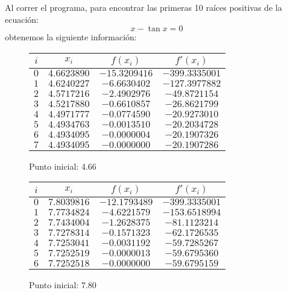 
Al correr el programa, para encontrar las primeras 10 raíces positivas de la ecuación:
\begin{equation*}
	x - \tan{x} = 0
\end{equation*}
obtenemos la siguiente información: 

\begin{figure}[H]
	\centering
	\caption{Punto inicial: 4.66}
	\begin{tabular}{|c|c|c|c|} \hline
		$i$ & $x_{i}$ & $f(x_{i})$ & $f'(x_{i})$ \\ \hline
		$0$ & $4.6623890$ & $-15.3209416$ & $-399.3335001$ \\ \hline
		$1$ & $4.6240227$ & $-6.6630402$ & $-127.3977882$ \\ \hline
		$2$ & $4.5717216$ & $-2.4902976$ & $-49.8721154$ \\ \hline
		$3$ & $4.5217880$ & $-0.6610857$ & $-26.8621799$ \\ \hline
		$4$ & $4.4971777$ & $-0.0774590$ & $-20.9273010$ \\ \hline
		$5$ & $4.4934763$ & $-0.0013510$ & $-20.2034728$ \\ \hline
		$6$ & $4.4934095$ & $-0.0000004$ & $-20.1907326$ \\ \hline
		$7$ & $4.4934095$ & $-0.0000000$ & $-20.1907286$ \\ \hline
	\end{tabular}
\end{figure}
\begin{figure}[H]
	\centering
	\caption{Punto inicial: 7.80}
	\begin{tabular}{|c|c|c|c|} \hline
		$i$ & $x_{i}$ & $f(x_{i})$ & $f'(x_{i})$ \\ \hline
		$0$ & $7.8039816$ & $-12.1793489$ & $-399.3335001$ \\ \hline
		$1$ & $7.7734824$ & $-4.6221579$ & $-153.6518994$ \\ \hline
		$2$ & $7.7434004$ & $-1.2628375$ & $-81.1123214$ \\ \hline
		$3$ & $7.7278314$ & $-0.1571323$ & $-62.1726535$ \\ \hline
		$4$ & $7.7253041$ & $-0.0031192$ & $-59.7285267$ \\ \hline
		$5$ & $7.7252519$ & $-0.0000013$ & $-59.6795360$ \\ \hline
		$6$ & $7.7252518$ & $-0.0000000$ & $-59.6795159$ \\ \hline
	\end{tabular}
\end{figure}
